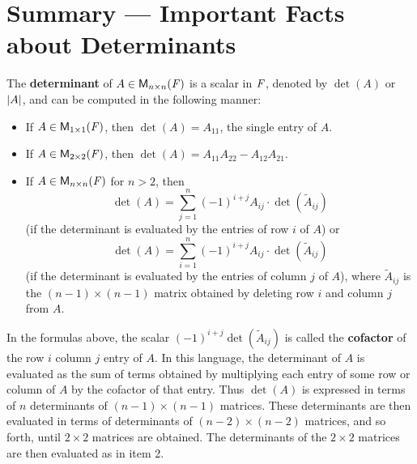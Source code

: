 \section{Summary --- Important Facts about Determinants}\label{sec:4.4}

\begin{note}
  The \textbf{determinant} of \(A \in \mathsf{M}_{{n} \times n}({\mathit{F}})\) is a scalar in \(\mathit{F}\), denoted by \(\det(A)\) or \(\left\lvert A\right\rvert\), and can be computed in the following manner:
  \begin{itemize}
    \item If \(A \in \mathsf{M}_{{1} \times 1}({\mathit{F}})\), then \(\det(A) = A_{1 1}\), the single entry of \(A\).
    \item If \(A \in \mathsf{M}_{{2} \times 2}({\mathit{F}})\), then \(\det(A) = A_{1 1} A_{2 2} - A_{1 2} A_{2 1}\).
    \item If \(A \in \mathsf{M}_{{n} \times n}({\mathit{F}})\) for \(n > 2\), then
          \[
            \det(A) = \sum_{j = 1}^n (-1)^{i + j} A_{i j} \cdot \det(\tilde{A}_{i j})
          \]
          (if the determinant is evaluated by the entries of row \(i\) of \(A\)) or
          \[
            \det(A) = \sum_{i = 1}^n (-1)^{i + j} A_{i j} \cdot \det(\tilde{A}_{i j})
          \]
          (if the determinant is evaluated by the entries of column \(j\) of \(A\)), where \(\tilde{A}_{i j}\) is the \((n - 1) \times (n - 1)\) matrix obtained by deleting row \(i\) and column \(j\) from \(A\).
  \end{itemize}
  In the formulas above, the scalar \((-1)^{i + j} \det(\tilde{A}_{i j})\) is called the \textbf{cofactor} of the row \(i\) column \(j\) entry of \(A\).
  In this language, the determinant of \(A\) is evaluated as the sum of terms obtained by multiplying each entry of some row or column of \(A\) by the cofactor of that entry.
  Thus \(\det(A)\) is expressed in terms of \(n\) determinants of \((n - 1) \times (n - 1)\) matrices.
  These determinants are then evaluated in terms of determinants of \((n - 2) \times (n - 2)\) matrices, and so forth, until \(2 \times 2\) matrices are obtained.
  The determinants of the \(2 \times 2\) matrices are then evaluated as in item 2.
\end{note}

